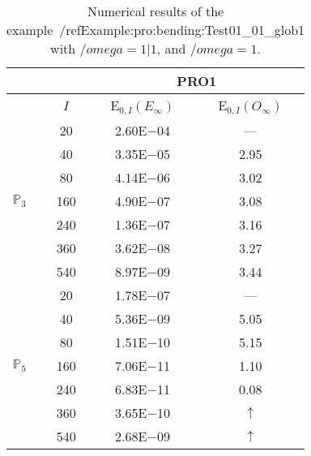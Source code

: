 \begin{table}[H]
\caption{Numerical results of the example~/ref{Example:pro:bending:Test01_01_glob1} with $/omega=1|1$, and $/omega=1$.}
\setlength{\tabcolsep}{5pt}
\centering
\begin{tabular}{@{}l c c c@{}}
\toprule
 &  & \multicolumn{2}{c}{PRO1}\\
\midrule
 & $I$ & E$_{0,I}(E_{\infty})$ & E$_{0,I}(O_{\infty})$\\
\midrule
\multirow{7}{*}{$\mathbb{P}_{3}$}
 & 20 & 2.60E$-$04 & ---\\
 & 40 & 3.35E$-$05 & 2.95\\
 & 80 & 4.14E$-$06 & 3.02\\
 & 160 & 4.90E$-$07 & 3.08\\
 & 240 & 1.36E$-$07 & 3.16\\
 & 360 & 3.62E$-$08 & 3.27\\
 & 540 & 8.97E$-$09 & 3.44\\
\midrule
\multirow{7}{*}{$\mathbb{P}_{5}$}
 & 20 & 1.78E$-$07 & ---\\
 & 40 & 5.36E$-$09 & 5.05\\
 & 80 & 1.51E$-$10 & 5.15\\
 & 160 & 7.06E$-$11 & 1.10\\
 & 240 & 6.83E$-$11 & 0.08\\
 & 360 & 3.65E$-$10 & $\uparrow$\\
 & 540 & 2.68E$-$09 & $\uparrow$\\
\bottomrule
\end{tabular}
\label{Table:pRO:test_01_01_test1_pro2}
\end{table}
